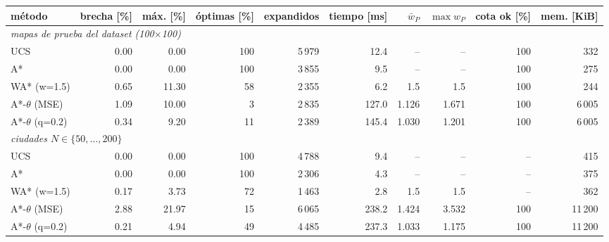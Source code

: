 \begin{tabular}{lrrrrrrrrr}
\toprule
método & brecha [\%] & máx. [\%] & óptimas [\%] & expandidos & tiempo [ms] & $\bar w_P$ & $\max w_P$ & cota ok [\%] & mem. [KiB] \\
\midrule
\multicolumn{10}{l}{\emph{mapas de prueba del dataset (100$\times$100)}} \\
UCS & 0.00 & 0.00 & 100 & 5\,979 & 12.4 & -- & -- & 100 & 332 \\
A* & 0.00 & 0.00 & 100 & 3\,855 & 9.5 & -- & -- & 100 & 275 \\
WA* (w=1.5) & 0.65 & 11.30 & 58 & 2\,355 & 6.2 & 1.5 & 1.5 & 100 & 244 \\
A*-$\theta$ (MSE) & 1.09 & 10.00 & 3 & 2\,835 & 127.0 & 1.126 & 1.671 & 100 & 6\,005 \\
A*-$\theta$ (q=0.2) & 0.34 & 9.20 & 11 & 2\,389 & 145.4 & 1.030 & 1.201 & 100 & 6\,005 \\
\midrule
\multicolumn{10}{l}{\emph{ciudades $N\in\{50,\dots,200\}$}} \\
UCS & 0.00 & 0.00 & 100 & 4\,788 & 9.4 & -- & -- & -- & 415 \\
A* & 0.00 & 0.00 & 100 & 2\,306 & 4.3 & -- & -- & -- & 375 \\
WA* (w=1.5) & 0.17 & 3.73 & 72 & 1\,463 & 2.8 & 1.5 & 1.5 & -- & 362 \\
A*-$\theta$ (MSE) & 2.88 & 21.97 & 15 & 6\,065 & 238.2 & 1.424 & 3.532 & 100 & 11\,200 \\
A*-$\theta$ (q=0.2) & 0.21 & 4.94 & 49 & 4\,485 & 237.3 & 1.033 & 1.175 & 100 & 11\,200 \\
\bottomrule
\end{tabular}
